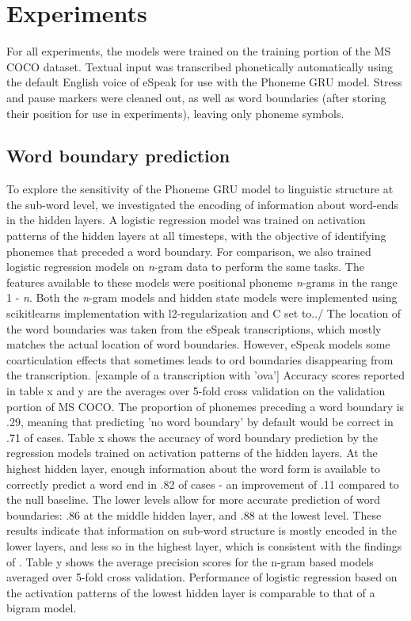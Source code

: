 \section{Experiments}
\label{sec:experiments}

For all experiments, the models were trained on the training portion %
of the MS COCO dataset. Textual input was transcribed phonetically automatically using the default English voice of eSpeak for use with the {\sc Phoneme GRU} model.
Stress and pause markers were cleaned out, as well as word boundaries (after storing their position for use in experiments), leaving only phoneme symbols. %

\subsection{Word boundary prediction}
To explore the sensitivity of the {\sc Phoneme GRU} model to linguistic structure at the sub-word level, we investigated the encoding of information about word-ends in the hidden layers. A logistic regression model was trained on activation patterns of the hidden layers at all timesteps, with the objective of identifying phonemes that preceded a word boundary. For comparison, we also trained logistic regression models on \textit{n}-gram data to perform the same tasks. The features available to these models were positional phoneme \textit{n}-grams in the range 1 - \textit{n}. Both the \textit{n}-gram models and hidden state models were implemented using scikitlearns implementation with l2-regularization and C set to../ The location of the word boundaries was taken from the eSpeak transcriptions, which mostly matches the actual location of word boundaries.  However, eSpeak models some coarticulation effects that sometimes leads to ord boundaries disappearing from the transcription. [example of a transcription with 'ova']
Accuracy scores reported in table x and y are the averages over 5-fold cross validation on the validation portion of MS COCO. The proportion of phonemes preceding a word boundary is .29, meaning that predicting 'no word boundary' by default would be correct in .71 of cases. 
Table x shows the accuracy of word boundary prediction by the regression models trained on activation patterns of the hidden layers. At the highest hidden layer, enough information about the word form is available to correctly predict a word end in .82 of cases - an improvement of .11 compared to the null baseline. The lower levels allow for more accurate prediction of word boundaries: .86 at the middle hidden layer, and .88 at the lowest level. These results indicate that information on sub-word structure is mostly encoded in the lower layers, and less so in the highest layer, which is consistent with the findings of . 
Table y shows the average precision scores for the n-gram based models averaged over 5-fold cross validation. Performance of logistic regression based on the activation patterns of the lowest hidden layer is comparable to that of a bigram model. 

